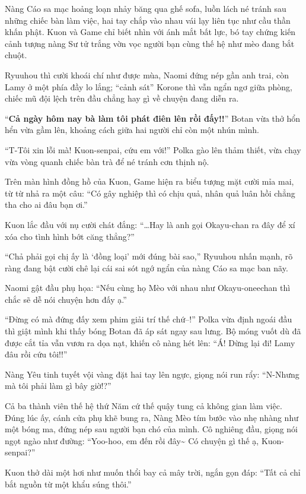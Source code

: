 \documentclass[../main.tex]{subfiles}
\begin{document}
Nàng Cáo sa mạc hoảng loạn nhảy băng qua ghế sofa, luồn lách né tránh sau những chiếc bàn làm việc, hai tay chắp vào nhau vái lạy liên tục như cầu thần khấn phật. Kuon và Game chỉ biết nhìn với ánh mắt bất lực, bó tay chứng kiến cảnh tượng nàng Sư tử trắng vờn vọc người bạn cùng thế hệ như mèo đang bắt chuột.

Ryuuhou thì cười khoái chí như được mùa, Naomi đứng nép gần anh trai, còn Lamy ở một phía đầy lo lắng; ``cảnh sát'' Korone thì vẫn ngẩn ngơ giữa phòng, chiếc mũ đội lệch trên đầu chẳng hay gì về chuyện đang diễn ra.

``\textbf{Cả ngày hôm nay bà làm tôi phát điên lên rồi đấy!!}'' Botan vừa thở hổn hển vừa gầm lên, khoảng cách giữa hai người chỉ còn một nhún mình.

``T-Tôi xin lỗi mà! Kuon-senpai, cứu em với!'' Polka gào lên thảm thiết, vừa chạy vừa vòng quanh chiếc bàn trà để né tránh cơn thịnh nộ.

Trên màn hình đồng hồ của Kuon, Game hiện ra biểu tượng mặt cười mỉa mai, từ từ nhả ra một câu: ``Có gây nghiệp thì có chịu quả, nhân quả luân hồi chẳng tha cho ai đâu bạn ơi.''

Kuon lắc đầu với nụ cười chát đắng: ``\dots Hay là anh gọi Okayu-chan ra đây để xí xóa cho tình hình bớt căng thẳng?''

``Chả phải gọi chị ấy là `đồng loại' mới đúng bài sao,'' Ryuuhou nhấn mạnh, rõ ràng đang bật cười chê lại cái sai sót ngớ ngẩn của nàng Cáo sa mạc ban nãy.

Naomi gật đầu phụ họa: ``Nếu cùng họ Mèo với nhau như Okayu-oneechan thì chắc sẽ dễ nói chuyện hơn đấy ạ.''

``Đừng có mà đứng đấy xem phim giải trí thế chứ--!'' Polka vừa định ngoái đầu thì giật mình khi thấy bóng Botan đã áp sát ngay sau lưng. Bộ móng vuốt dù đã được cắt tỉa vẫn vươn ra dọa nạt, khiến cô nàng hét lên: ``Á! Dừng lại đi! Lamy đâu rồi cứu tôi!!''

Nàng Yêu tinh tuyết vội vàng đặt hai tay lên ngực, giọng nói run rẩy: ``N-Nhưng mà tôi phải làm gì bây giờ!?''

Cả ba thành viên thế hệ thứ Năm cứ thế quậy tung cả không gian làm việc. Đúng lúc ấy, cánh cửa phụ khẽ bung ra, Nàng Mèo tím bước vào nhẹ nhàng như một bóng ma, đứng nép sau người bạn chó của mình. Cô nghiêng đầu, giọng nói ngọt ngào như đường: ``Yoo-hoo, em đến rồi đây\~{} Có chuyện gì thế ạ, Kuon-senpai?''

Kuon thở dài một hơi như muốn thổi bay cả mây trời, ngắn gọn đáp: ``Tất cả chỉ bắt nguồn từ một khẩu súng thôi.''
\end{document}
